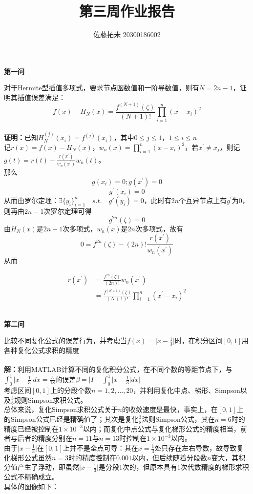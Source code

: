 \documentclass[12pt]{article}
\title{第三周作业报告}
\author{佐藤拓未 20300186002}
\date{}
\begin{document}
	\maketitle
	\begin{center}
	\textbf{第一问}
	\end{center}
	对于Hermite型插值多项式，要求节点函数值和一阶导数值，则有$N=2n-1$，证明其插值误差满足：$$f(x)-H_N(x)=\frac{f^{(N+1)}(\zeta)}{(N+1)!}\prod_{i=1}^n(x-x_i)^2$$
	\\
	\noindent \textbf{证明：}已知$H_N^{(j)}(x_i)=f^{(j)}(x_i)$，其中$0\le{j}\le{1}$，$1\le{i}\le{n}$\\
	记$r(x)=f(x)-H_N(x)$，$w_n(x)=\prod_{i=1}^n(x-x_i)^2$，若${x^'}\ne{x_j}$，则记$g(t)=r(t)-{\frac{r(x^')}{w_n(x^')}}w_n(t)$。\\
	那么$$g(x_i)=0;g({x^'})=0$$ $${g^'}(x_i)=0$$
	从而由罗尔定理：$\exists \{y_i\}_{i=1}^n\quad s.t.\quad {g'(y_i)}=0$，此时有$2n$个互异节点上有${g^'}$为0，则再由$2n-1$次罗尔定理可得$$g^{2n}(\zeta)=0$$
	由$H_N(x)$是$2n-1$次多项式，$w_n(x)$是$2n$次多项式，故有$$0=f^{2n}(\zeta)-(2n)!\frac{r({x^'})}{w_n({x^'})}$$
	从而

		\begin{align*}
			r({x^'})&=\frac{f^{2n}(\zeta)}{(2n)!}w_n({x^'})\\
			&=\frac{f^{(N+1)}(\zeta)}{(N+1)!}\prod_{i=1}^n({x^'}-x_i)^2
		\end{align*}
	\\
	\begin{center}
		\textbf{第二问}
	\end{center}
比较不同复化公式的误差行为，并考虑当$f(x)=\vert{x-\frac{1}{3}}\vert$时，在积分区间$[0,1]$用各种复化公式求积的精度\\
\\
\textbf{解：}利用MATLAB计算不同的复化积分公式，在不同个数的等距节点下，与$\int_{0}^1\vert{x-\frac{1}{3}}\vert dx=\frac{5}{18}$的误差$\beta=\vert{I-\int_{0}^1\vert{x-\frac{1}{3}}\vert dx}\vert$\\
考虑区间$[0,1]$上的分段个数$n=1,2,\dots,20$，并利用复化中点、梯形、Simpson以及$\frac{3}{8}$规则Simpson求积公式。\\
总体来说，复化Simpson求积公式关于$n$的收敛速度是最快，事实上，在$[0,1]$上的Simpson公式已经是精确值了；其次是复化$\frac{3}{8}$法则Simpson公式，其在$n=6$时的精度已经被控制在$1\times{10^{-3}}$以内；而复化中点公式与复化梯形公式的精度相当，前者与后者的精度分别在$n=11$与$n=13$时控制在$1\times{10^{-3}}$以内。\\
由于$\vert{x-\frac{1}{3}}\vert$在$[0,1]$上并不是全点可导：其在$x=\frac{1}{3}$处只存在左右导数，故导致复化梯形公式虽然$n=3$时的精度控制在$0.001$以内，但后续随着分段数$n$变大，其积分值产生了浮动，即虽然$\vert{x-\frac{1}{3}}\vert$是分段1次的，但原本具有1次代数精度的梯形求积公式不精确成立。\\
具体的图像如下：
\end{document}
